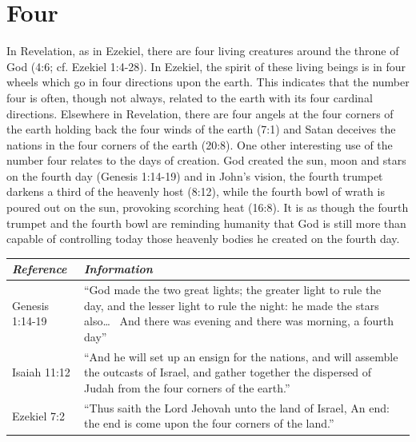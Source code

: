 \section*{Four}
In Revelation, as in Ezekiel, there are four living creatures around the throne of God (4:6; cf. Ezekiel 1:4-28). In Ezekiel, the spirit of these living beings is in four wheels which go in four directions upon the earth. This indicates that the number four is often, though not always, related to the earth with its four cardinal directions.
Elsewhere in Revelation, there are four angels at the four corners of the earth holding back the four winds of the earth (7:1) and Satan deceives the nations in the four corners of the earth (20:8). 
\newline\newline
One other interesting use of the number four relates to the days of creation. God created the sun, moon and stars on the fourth day (Genesis 1:14-19) and in John's vision, the fourth trumpet darkens a third of the heavenly host (8:12), while the fourth bowl of wrath is poured out on the sun, provoking scorching heat (16:8). It is as though the fourth trumpet and the fourth bowl are reminding humanity that God is still more than capable of controlling today those heavenly bodies he created on the fourth day.
\newline\newline
\begin{tabularx}{\textwidth}{l X}
\toprule
\rowcolor{headergray}\emph{Reference} & \emph{Information}\\ 
\midrule
Genesis 1:14-19 & ``God made the two great lights; the greater light to rule the day, and the lesser light to rule the night: he made the stars also\ldots~ And there was evening and there was morning, a fourth day'' \\
\addlinespace
Isaiah 11:12 & ``And he will set up an ensign for the nations, and will assemble the outcasts of Israel, and gather together the dispersed of Judah from the four corners of the earth.'' \\
\addlinespace
Ezekiel 7:2 & ``Thus saith the Lord Jehovah unto the land of Israel, An end: the end is come upon the four corners of the land.'' \\
\bottomrule
\end{tabularx}

